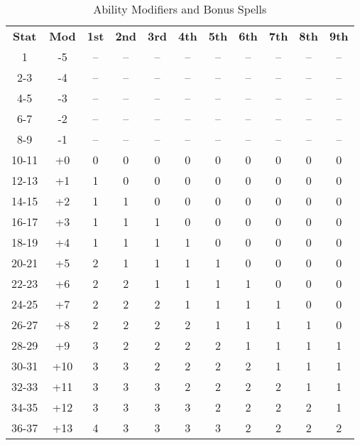 \begin{table}[htb]
\caption{Ability Modifiers and Bonus Spells}
\centering
\begin{tabular}{*{11}{c}}
\textbf{Stat} & \textbf{Mod} & \textbf{1st} & \textbf{2nd} & \textbf{3rd} & \textbf{4th} & \textbf{5th} & \textbf{6th} & \textbf{7th} & \textbf{8th} & \textbf{9th}\\
1 & -5 & -- & -- & -- & -- & -- & -- & -- & -- & -- \\
2-3 & -4 & -- & -- & -- & -- & -- & -- & -- & -- & -- \\
4-5 & -3 & -- & -- & -- & -- & -- & -- & -- & -- & -- \\
6-7 & -2 & -- & -- & -- & -- & -- & -- & -- & -- & -- \\
8-9 & -1 & -- & -- & -- & -- & -- & -- & -- & -- & -- \\
10-11 & +0 & 0 & 0 & 0 & 0 & 0 & 0 & 0 & 0 & 0\\
12-13 & +1 & 1 & 0 & 0 & 0 & 0 & 0 & 0 & 0 & 0\\
14-15 & +2 & 1 & 1 & 0 & 0 & 0 & 0 & 0 & 0 & 0\\
16-17 & +3 & 1 & 1 & 1 & 0 & 0 & 0 & 0 & 0 & 0\\
18-19 & +4 & 1 & 1 & 1 & 1 & 0 & 0 & 0 & 0 & 0\\
20-21 & +5 & 2 & 1 & 1 & 1 & 1 & 0 & 0 & 0 & 0\\
22-23 & +6 & 2 & 2 & 1 & 1 & 1 & 1 & 0 & 0 & 0\\
24-25 & +7 & 2 & 2 & 2 & 1 & 1 & 1 & 1 & 0 & 0\\
26-27 & +8 & 2 & 2 & 2 & 2 & 1 & 1 & 1 & 1 & 0\\
28-29 & +9 & 3 & 2 & 2 & 2 & 2 & 1 & 1 & 1 & 1\\
30-31 & +10 & 3 & 3 & 2 & 2 & 2 & 2 & 1 & 1 & 1\\
32-33 & +11 & 3 & 3 & 3 & 2 & 2 & 2 & 2 & 1 & 1\\
34-35 & +12 & 3 & 3 & 3 & 3 & 2 & 2 & 2 & 2 & 1\\
36-37 & +13 & 4 & 3 & 3 & 3 & 3 & 2 & 2 & 2 & 2\\
\end{tabular}
\end{table}

